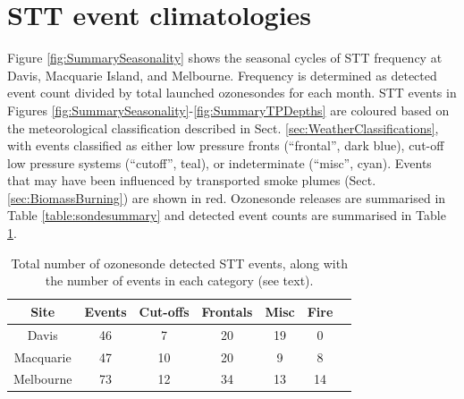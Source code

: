 \documentclass[acp, manuscript]{copernicus} %
\begin{document}
\section{STT event climatologies}
  \label{sec:eventclimatologies}
  Figure \ref{fig:SummarySeasonality} shows the seasonal cycles of STT frequency at Davis, Macquarie Island, and Melbourne.
  Frequency is determined as detected event count divided by total launched ozonesondes for each month.
  STT events in Figures \ref{fig:SummarySeasonality}-\ref{fig:SummaryTPDepths} are coloured based on the meteorological classification described in Sect. \ref{sec:WeatherClassifications}, with events classified as either low pressure fronts (“frontal”, dark blue), cut-off low pressure systems (“cutoff”, teal), or indeterminate (“misc”, cyan).
  Events that may have been influenced by transported smoke plumes (Sect. \ref{sec:BiomassBurning}) are shown in red.
  Ozonesonde releases are summarised in Table \ref{table:sondesummary} and detected event counts are summarised in Table \ref{table:EventCounts}.
  \begin{table}[t]
    \caption{Total number of ozonesonde detected STT events, along with the number of events in each category (see text).}
    \begin{tabular}{ c   c   c   c   c   c   c } 
      \hline
      Site & Events & Cut-offs & Frontals & Misc & Fire \\
      \hline
      Davis     & 46 & 7  & 20 & 19 & 0 \\ 
      Macquarie & 47 & 10 & 20 & 9  & 8 \\
      Melbourne & 73 & 12 & 34 & 13 & 14 \\
      \hline
    \end{tabular}
    \label{table:EventCounts}
  \end{table}
  
\end{document}
